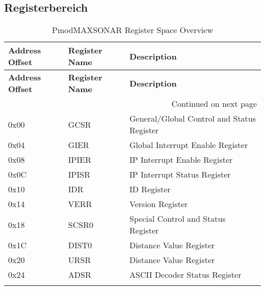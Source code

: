 \subsection{Registerbereich}
\begin{longtable}{|p{3cm}|p{3cm}|p{8cm}|}
    \hline
    \textbf{Address Offset} & \textbf{Register Name} & \textbf{Description} \\
    \hline
    \endfirsthead
    \hline
    \textbf{Address Offset} & \textbf{Register Name} & \textbf{Description} \\
    \hline
    \endhead
    \hline \multicolumn{3}{|r|}{{Continued on next page}} \\ \hline
    \endfoot
    \hline
    \endlastfoot

    0x00 & GCSR & General/Global Control and Status Register \\
    \hline
    0x04 & GIER & Global Interrupt Enable Register \\
    \hline
    0x08 & IPIER & IP Interrupt Enable Register \\
    \hline
    0x0C & IPISR & IP Interrupt Status Register \\
    \hline
    0x10 & IDR & ID Register \\
    \hline
    0x14 & VERR & Version Register \\
    \hline
    0x18 & SCSR0 & Special Control and Status Register \\
    \hline
    0x1C & DIST0 & Distance Value Register \\
    \hline
    0x20 & URSR & Distance Value Register \\
    \hline
    0x24 & ADSR & ASCII Decoder Status Register \\
    \hline
    \caption{PmodMAXSONAR Register Space Overview}
    \label{tab:register_overview}
    \end{longtable}

